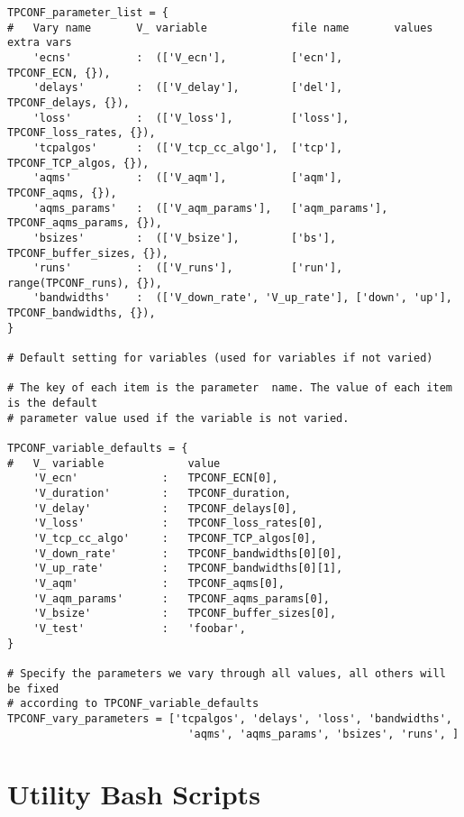 \begin{code}
\begin{verbatim}
TPCONF_parameter_list = {
#   Vary name		V_ variable	            file name	    values      extra vars
    'ecns' 	        :  (['V_ecn'],	        ['ecn'], 	    TPCONF_ECN, {}),
    'delays' 	    :  (['V_delay'], 	    ['del'], 	    TPCONF_delays, {}),
    'loss'  	    :  (['V_loss'], 	    ['loss'],   	TPCONF_loss_rates, {}),
    'tcpalgos' 	    :  (['V_tcp_cc_algo'],  ['tcp'], 	    TPCONF_TCP_algos, {}),
    'aqms'	        :  (['V_aqm'], 	        ['aqm'], 	    TPCONF_aqms, {}),
    'aqms_params'   :  (['V_aqm_params'],   ['aqm_params'], TPCONF_aqms_params, {}),
    'bsizes'	    :  (['V_bsize'], 	    ['bs'], 	    TPCONF_buffer_sizes, {}),
    'runs'	        :  (['V_runs'],         ['run'], 	    range(TPCONF_runs), {}),
    'bandwidths'    :  (['V_down_rate', 'V_up_rate'], ['down', 'up'], TPCONF_bandwidths, {}),
}

# Default setting for variables (used for variables if not varied)

# The key of each item is the parameter  name. The value of each item is the default
# parameter value used if the variable is not varied.

TPCONF_variable_defaults = {
#   V_ variable			    value
    'V_ecn'  		    :	TPCONF_ECN[0],
    'V_duration'  	    :	TPCONF_duration,
    'V_delay'  		    :	TPCONF_delays[0],
    'V_loss'   		    :	TPCONF_loss_rates[0],
    'V_tcp_cc_algo' 	:	TPCONF_TCP_algos[0],
    'V_down_rate'   	:	TPCONF_bandwidths[0][0],
    'V_up_rate'	    	:	TPCONF_bandwidths[0][1],
    'V_aqm'	    	    :	TPCONF_aqms[0],
    'V_aqm_params'      :   TPCONF_aqms_params[0],
    'V_bsize'	    	:	TPCONF_buffer_sizes[0],
    'V_test'	    	:	'foobar',
}

# Specify the parameters we vary through all values, all others will be fixed
# according to TPCONF_variable_defaults
TPCONF_vary_parameters = ['tcpalgos', 'delays', 'loss', 'bandwidths',
                            'aqms', 'aqms_params', 'bsizes', 'runs', ]    
\end{verbatim}
\label{code:teacup-mixed}
\end{code}










\section{Utility Bash Scripts}


